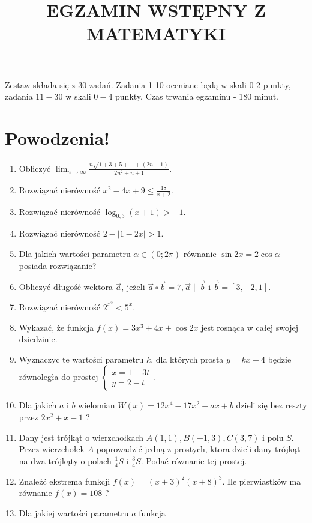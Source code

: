 \documentclass[10pt]{article}
\title{EGZAMIN WSTĘPNY Z MATEMATYKI }
\author{}
\date{}
\begin{document}
\maketitle
Zestaw składa się z 30 zadań. Zadania 1-10 oceniane będą w skali 0-2 punkty, zadania \(11-30\) w skali \(0-4\) punkty. Czas trwania egzaminu - 180 minut.

\section*{Powodzenia!}
\begin{enumerate}
  \item Obliczyć \(\lim _{n \rightarrow \infty} \frac{n \sqrt{1+3+5+\ldots+(2 n-1)}}{2 n^{2}+n+1}\).
  \item Rozwiązać nierówność \(x^{2}-4 x+9 \leqslant \frac{18}{x+2}\).
  \item Rozwiązać nierówność \(\log _{0,3}(x+1)>-1\).
  \item Rozwiązać nierówność \(2-|1-2 x|>1\).
  \item Dla jakich wartości parametru \(\alpha \in(0 ; 2 \pi)\) równanie \(\sin 2 x=2 \cos \alpha\) posiada rozwiązanie?
  \item Obliczyć długość wektora \(\vec{a}\), jeżeli \(\vec{a} \circ \vec{b}=7, \vec{a} \| \vec{b}\) i \(\vec{b}=[3,-2,1]\).
  \item Rozwiązać nierówność \(2^{x^{2}}<5^{x}\).
  \item Wykazać, że funkcja \(f(x)=3 x^{3}+4 x+\cos 2 x\) jest rosnąca w całej swojej dziedzinie.
  \item Wyznaczyc te wartości parametru \(k\), dla których prosta \(y=k x+4\) będzie równoległa do prostej \(\left\{\begin{array}{l}x=1+3 t \\ y=2-t\end{array}\right.\).
  \item Dla jakich \(a\) i \(b\) wielomian \(W(x)=12 x^{4}-17 x^{2}+a x+b\) dzieli się bez reszty przez \(2 x^{2}+x-1\) ?
  \item Dany jest trójkąt o wierzchołkach \(A(1,1), B(-1,3), C(3,7)\) i polu \(S\). Przez wierzchołek \(A\) poprowadzić jedną z prostych, ktora dzieli dany trójkąt na dwa trójkąty o polach \(\frac{1}{4} S\) i \(\frac{3}{4} S\). Podać równanie tej prostej.
  \item Znaleźć ekstrema funkcji \(f(x)=(x+3)^{2}(x+8)^{3}\). Ile pierwiastków ma równanie \(f(x)=108\) ?
  \item Dla jakiej wartości parametru \(a\) funkcja
\end{enumerate}
\end{document}
